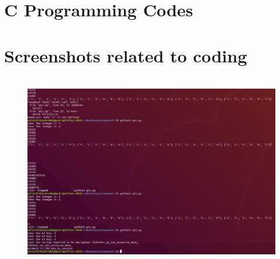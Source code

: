 \documentclass[10pt]{article}
\begin{document}
\newpage

\section{\textbf{\large C Programming Codes}}



\section{\textbf{\large Screenshots related to coding}}
\begin{figure}[h!]
	\centering
	\includegraphics[width=15cm,height=8.5cm]{Screenshot1}
\end{figure}

\newpage

 
\end{document}
